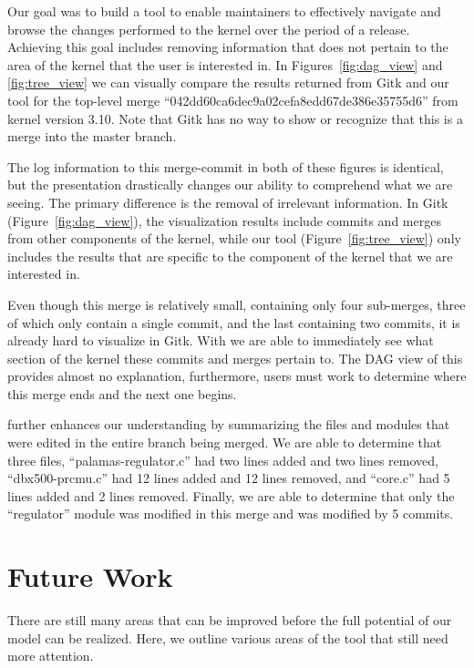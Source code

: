 \documentclass[conference, draftclsnofoot, draft]{IEEEtran}
\begin{document}
Our goal was to build a tool to enable maintainers to effectively navigate and
browse the changes performed to the kernel over the period of a release. Achieving
this goal includes removing information that does not pertain to the area of the
kernel that the user is interested in. In Figures~\ref{fig:dag_view} and
\ref{fig:tree_view} we can visually compare the results returned from Gitk
and our tool for the top-level merge ``042dd60ca6dec9a02cefa8edd67de386e35755d6''
from kernel version 3.10. Note that Gitk has no way to show or recognize that this
is a merge into the master branch.

The log information to this merge-commit in both of these figures is identical, but
the presentation drastically changes our ability to comprehend what we are seeing.
The primary difference is the removal of irrelevant information. In Gitk
(Figure~\ref{fig:dag_view}), the visualization results include commits and merges
from other components of the kernel, while our tool (Figure~\ref{fig:tree_view})
only includes the results that are specific to the component of the kernel that we
are interested in.

Even though this merge is relatively small, containing only four sub-merges, three of which
only contain a single commit, and the last containing two commits, it is already hard to visualize in Gitk.
With \tool we are able to immediately see what section of the kernel these commits and merges pertain to. The DAG view of this provides almost no explanation,
furthermore, users must work to determine where this merge ends and the next one
begins.

\tool further enhances our understanding by summarizing the files
and modules that were edited in the entire branch being merged. We are able to determine that three
files, ``palamas-regulator.c'' had two lines added and two lines removed,
``dbx500-prcmu.c'' had 12 lines added and 12 lines removed, and ``core.c'' had 5
lines added and 2 lines removed. Finally, we are able to determine that only the
``regulator'' module was modified in this merge and was modified by 5 commits.

\section{Future Work}

There are still many areas that can be improved before the full potential of our
model can be realized. Here, we outline various areas of the tool that still need
more attention.
\end{document}

